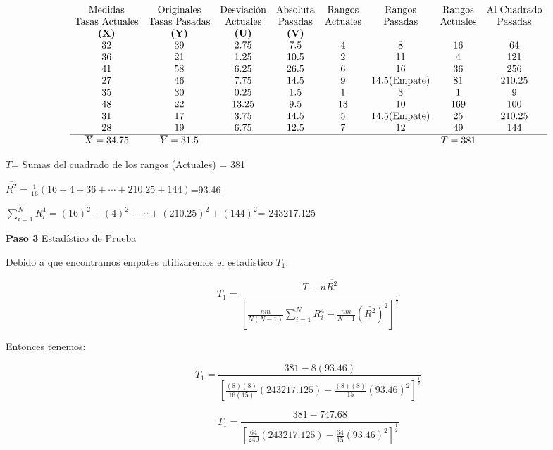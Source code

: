 \documentclass[
  a4paper,
  oneside,
  openany]{book}
\begin{document}
\[
\begin{array}{c c c c c c c c }
\mbox{Medidas} & \mbox{Originales} & \mbox{Desviación} & \mbox{Absoluta} & \mbox{Rangos} & \mbox{Rangos} & \mbox{Rangos} & \mbox{Al Cuadrado} \\
\mbox{Tasas Actuales} & \mbox{Tasas Pasadas} & \mbox{Actuales} & \mbox{Pasadas} & \mbox{Actuales} & \mbox{Pasadas}& \mbox{Actuales} & \mbox{Pasadas} \\
\textbf{(X)} & \textbf{(Y)} & \textbf{(U)}   & \textbf{(V)}  &     &               &     &         \\
32  & 39  & 2.75  & 7.5  &  4  &  8            & 16  &  64         \\
36  & 21  & 1.25  & 10.5 &  2  &  11           &  4  &  121    \\
41  & 58  & 6.25  & 26.5 &  6 &   16           & 36  &  256       \\
27  & 46  & 7.75  & 14.5 &  9  &  14.5(\mbox{Empate})& 81  &  210.25       \\
35  & 30  & 0.25  & 1.5  &  1  &  3            & 1   &  9     \\
48  & 22  & 13.25 & 9.5  &  13 &  10           & 169 &  100    \\
31  & 17  & 3.75  & 14.5 &  5  &  14.5(\mbox{Empate})& 25  &  210.25     \\
28  & 19  & 6.75  & 12.5 &  7  &  12           & 49  &  144   \\
\hline
\overline{X}= 34.75 & \overline{Y}= 31.5 & & & & & T=381
\end{array}
\]

\(T\)= Sumas del cuadrado de los rangos (Actuales) = 381

\(\overline{R^2}= \frac{1}{16}\left(16+4+36+\cdots+210.25+144\right)\)=93.46

\(\sum_{i=1}^{N}R_{i}^4= (16)^2+(4)^2+\cdots+(210.25)^2+(144)^2\)= 243217.125

\textbf{Paso 3} Estadístico de Prueba

Debido a que encontramos empates utilizaremos el estadístico \(T_{1}\):

\[T_{1} = \frac{T-n\overline{R^2}}{\left[\frac{nm}{N(N-1)}\sum_{i=1}^{N}R_{i}^4-\frac{nm}{N-1}(\overline{R^2})^2\right]^\frac{1}{2}}\]

Entonces tenemos:

\[T_{1} = \frac{381-8(93.46)}{\left[\frac{(8)(8)}{16(15)}(243217.125)-\frac{(8)(8)}{15}(93.46)^2\right]^\frac{1}{2}}\]

\[T_{1} = \frac{381-747.68}{\left[\frac{64}{240}(243217.125)-\frac{64}{15}(93.46)^2\right]^\frac{1}{2}}\]
\end{document}
